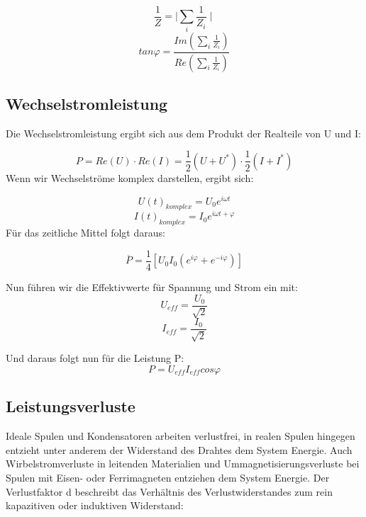 \documentclass{article}
\begin{document}
\begin{equation}
\frac{1}{Z}=\mid{ \sum \limits_{i} \frac{1}{Z_{i}}}\mid 
\end{equation}
\begin{equation}
tan\varphi = {\frac{Im({\sum\limits_{i}{\frac{1}{Z_i}}})}{Re({\sum\limits_{i}{\frac{1}{Z_i}}})}}
\end{equation}

\subsection{Wechselstromleistung}
Die Wechselstromleistung ergibt sich aus dem Produkt der Realteile von U und I:

\begin{equation}
P=Re(U)\cdot Re(I)=\frac{1}{2}(U+U^*)\cdot \frac{1}{2}(I+I^*)
\end{equation}
Wenn wir Wechselströme komplex darstellen, ergibt sich:

\begin{equation}
U(t)_{komplex}=U_{0}e^{i\omega t}
\end{equation}
\begin{equation}
I(t)_{komplex}=I_{0}e^{i\omega t+\varphi}
\end{equation}
Für das zeitliche Mittel folgt daraus:

\begin{equation}
\overline{P}=\frac{1}{4}\left[U_{0}I_{0}(e^{i\varphi }+e^{-i\varphi })\right]
\end{equation}

Nun führen wir die Effektivwerte für Spannung und Strom ein mit:
\begin{equation}
U_{eff}=\frac{U_{0}}{\sqrt{2}}
\end{equation}
\begin{equation}
I_{eff}=\frac{I_{0}}{\sqrt{2}}
\end{equation}

Und daraus folgt nun für die Leistung P:
\begin{equation}
P=U_{eff}I_{eff}cos \varphi
\end{equation}

\subsection{Leistungsverluste}
Ideale Spulen und Kondensatoren arbeiten verlustfrei, in realen Spulen hingegen entzieht unter anderem der Widerstand des Drahtes dem System Energie. Auch Wirbelstromverluste in leitenden Materialien und Ummagnetisierungsverluste bei Spulen mit Eisen- oder Ferrimagneten entziehen dem System Energie.
Der Verlustfaktor d beschreibt das Verhältnis des Verlustwiderstandes zum rein kapazitiven oder induktiven Widerstand:
\end{document}
